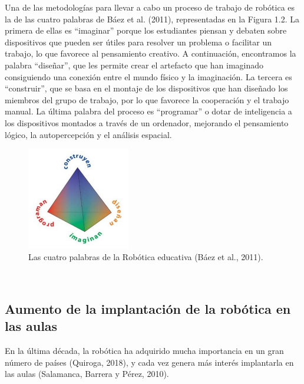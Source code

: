 \documentclass{report}
\begin{document}
Una de las metodologías para llevar a cabo un proceso de trabajo de robótica es la de las cuatro palabras de Báez et al. (2011), representadas en la Figura 1.2. La primera de ellas es “imaginar” porque los estudiantes piensan y debaten sobre dispositivos que pueden ser útiles para resolver un problema o facilitar un trabajo, lo que favorece al pensamiento creativo. A continuación, encontramos la palabra “diseñar”, que les permite crear el artefacto que han imaginado consiguiendo una conexión entre el mundo físico y la imaginación. La tercera es “construir”, que se basa en el montaje de los dispositivos que han diseñado los miembros del grupo de trabajo, por lo que favorece la cooperación y el trabajo manual. La última palabra del proceso es “programar” o dotar de inteligencia a los dispositivos montados a través de un ordenador, mejorando el pensamiento lógico, la autopercepción y el análisis espacial.
\\
\begin{figure}[h!]
  \centering
    \includegraphics[width=0.4\textwidth]{images/metodologia.png}
  \caption{Las cuatro palabras de la Robótica educativa (Báez et al., 2011).}
  \label{Metodologia}
\end{figure}
\\

\subsection{Aumento de la implantación de la robótica en las aulas}

En la última década, la robótica ha adquirido mucha importancia en un gran número de países (Quiroga, 2018), y cada vez genera más interés implantarla en las aulas (Salamanca, Barrera y Pérez, 2010).
\\
\end{document}

